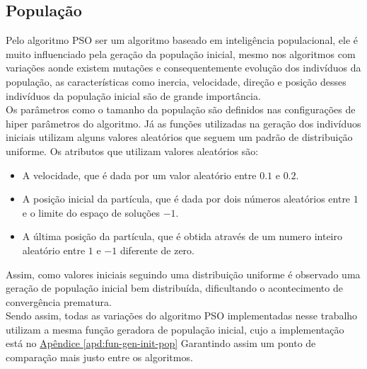 \subsection{População}
Pelo algoritmo PSO ser um algoritmo baseado em inteligência populacional, ele é muito influenciado pela geração da população inicial, mesmo nos algoritmos com variações aonde existem mutações e consequentemente evolução dos indivíduos da população, as características como inercia, velocidade, direção e posição desses indivíduos da população inicial são de grande importância.\\
%
%
\indent Os parâmetros como o tamanho da população são definidos nas configurações de hiper parâmetros do algoritmo.
%
Já as funções utilizadas na geração dos indivíduos iniciais utilizam alguns valores aleatórios que seguem um padrão de distribuição uniforme. Os atributos que utilizam valores aleatórios são:
\begin{itemize}
    \item A velocidade, que é dada por um valor aleatório entre $0.1$ e $0.2$.
    \item A posição inicial da partícula, que é dada por dois números aleatórios entre $1$ e o limite do espaço de soluções $- 1$.
    \item A última posição da partícula, que é obtida através de um numero inteiro aleatório entre $1$ e $-1$ diferente de zero.
\end{itemize}
%
%
\indent Assim, como valores iniciais seguindo uma distribuição uniforme é observado uma geração de população inicial bem distribuída, dificultando o acontecimento de convergência prematura.\\
%
%
Sendo assim, todas as variações do algoritmo PSO implementadas nesse trabalho utilizam a mesma função geradora de população inicial, cujo a implementação está no 
\hyperref[apd:fun-gen-init-pop]{Apêndice \ref{apd:fun-gen-init-pop}}
\noindent Garantindo assim um ponto de comparação mais justo entre os algoritmos.
